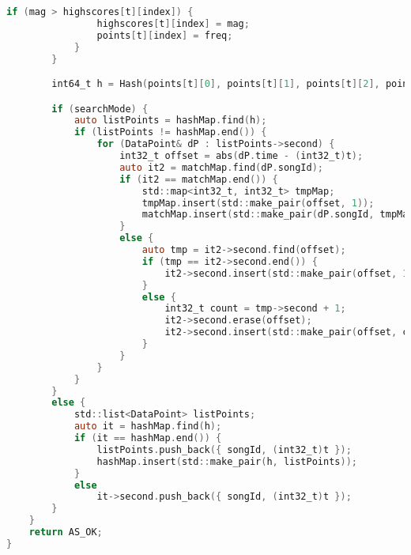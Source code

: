 \begin{lstlisting}[language=C, mathescape]
            if (mag > highscores[t][index]) {
                highscores[t][index] = mag;
                points[t][index] = freq;
            }
        }

        int64_t h = Hash(points[t][0], points[t][1], points[t][2], points[t][3]);

        if (searchMode) {
            auto listPoints = hashMap.find(h);
            if (listPoints != hashMap.end()) {
                for (DataPoint& dP : listPoints->second) {
                    int32_t offset = abs(dP.time - (int32_t)t);
                    auto it2 = matchMap.find(dP.songId);
                    if (it2 == matchMap.end()) {
                        std::map<int32_t, int32_t> tmpMap;
                        tmpMap.insert(std::make_pair(offset, 1));
                        matchMap.insert(std::make_pair(dP.songId, tmpMap));
                    }
                    else {
                        auto tmp = it2->second.find(offset);
                        if (tmp == it2->second.end()) {
                            it2->second.insert(std::make_pair(offset, 1));
                        }
                        else {
                            int32_t count = tmp->second + 1;
                            it2->second.erase(offset);
                            it2->second.insert(std::make_pair(offset, count));
                        }
                    }
                }
            }
        }
        else {
            std::list<DataPoint> listPoints;
            auto it = hashMap.find(h);
            if (it == hashMap.end()) {
                listPoints.push_back({ songId, (int32_t)t });
                hashMap.insert(std::make_pair(h, listPoints));
            }
            else
                it->second.push_back({ songId, (int32_t)t });
        }
    }
    return AS_OK;
}


\end{lstlisting}

